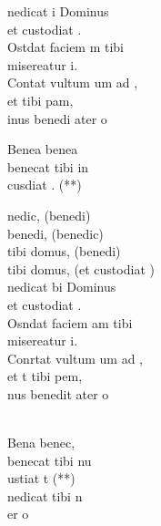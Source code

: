 \begin{cancion}[Benedicat][]%
	nedicat i Dominus \\
	et custodiat .\\
	Ostdat faciem m tibi\\
	 misereatur i.\\
	Contat vultum um ad ,\\
	et  tibi pam,\\
	inus benedi ater o \jump\\
	\begin{chorus}%
		Benea     benea \\
		benecat tibi in\\
		 cusdiat . (**)\jump\\
	\end{chorus}%
	nedic, (benedi)\\
	benedi, (benedic)\\
	tibi domus, (benedi)\\
	tibi domus, (et custodiat )\\
	\jump
	nedicat bi Dominus\\
	et custodiat .\\
	Osndat faciem am tibi\\
	 misereatur i.\\
	Conrtat vultum um ad ,\\
	et t tibi pem,\\
	nus benedit ater o \\
	\jumjump\\
	\begin{chorus}%
		Bena     benec,\chord{Si}{}{  }\\
		benecat tibi nu\chord{La}{}{s,}\\
		ustiat t (**)\\
	\jump
		nedicat tibi n\chord{Sol}{}{us }\\
		er o \jump\\
	\end{chorus}%
	\jump
	\jump
	\jump
\end{cancion}%
